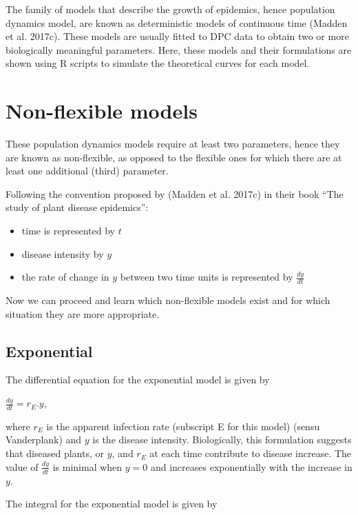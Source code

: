 \documentclass[
  letterpaper,
  DIV=11,
  numbers=noendperiod]{scrreprt}
\begin{document}
The family of models that describe the growth of epidemics, hence
population dynamics model, are known as deterministic models of
continuous time (Madden et al. 2017c). These models are usually fitted
to DPC data to obtain two or more biologically meaningful parameters.
Here, these models and their formulations are shown using R scripts to
simulate the theoretical curves for each model.

\hypertarget{non-flexible-models}{%
\section{Non-flexible models}\label{non-flexible-models}}

These population dynamics models require at least two parameters, hence
they are known as non-flexible, as opposed to the flexible ones for
which there are at least one additional (third) parameter.

Following the convention proposed by (Madden et al. 2017c) in their book
``The study of plant disease epidemics'':

\begin{itemize}
\item
  time is represented by \(t\)
\item
  disease intensity by \(y\)
\item
  the rate of change in \(y\) between two time units is represented by
  \(\frac{dy}{dt}\)
\end{itemize}

Now we can proceed and learn which non-flexible models exist and for
which situation they are more appropriate.

\hypertarget{exponential}{%
\subsection{Exponential}\label{exponential}}

The differential equation for the exponential model is given by

\(\frac{dy}{dt} = r_E.y\),

where \(r_E\) is the apparent infection rate (subscript E for this
model) (sensu Vanderplank) and \(y\) is the disease intensity.
Biologically, this formulation suggests that diseased plants, or \(y\),
and \(r_E\) at each time contribute to disease increase. The value of
\(\frac{dy}{dt}\) is minimal when \(y = 0\) and increases exponentially
with the increase in \(y\).

The integral for the exponential model is given by
\end{document}
